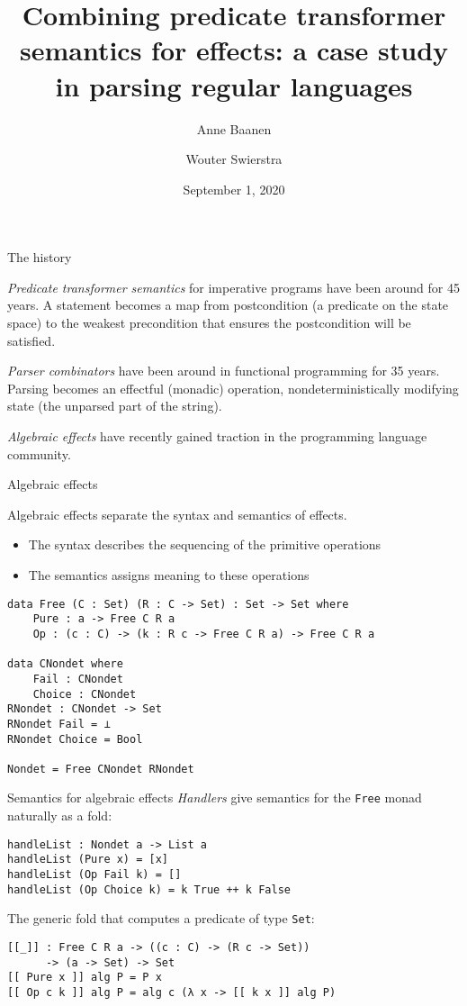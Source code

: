 \documentclass{beamer}
\title[Combining predicate transformer semantics]{Combining predicate transformer semantics for effects: a case study in parsing regular languages}
\author{Anne Baanen \and Wouter Swierstra}
\date{September 1, 2020}
\newcommand{\Agda}[1]{\texttt{\footnotesize #1}\xspace}
\newcommand{\Free}{\Agda{Free}}
\newcommand{\Set}{\Agda{Set}}
\begin{document}
\titlepage

\begin{frame}{The history}

\emph{Predicate transformer semantics} for imperative programs have been around for 45 years.
A statement becomes a map from postcondition (a predicate on the state space) to the weakest precondition that ensures the postcondition will be satisfied.

\pause

\emph{Parser combinators} have been around in functional programming for 35 years.
Parsing becomes an effectful (monadic) operation, nondeterministically modifying state (the unparsed part of the string).

\pause

\emph{Algebraic effects} have recently gained traction in the programming language community.

\end{frame}

\begin{frame}[fragile]{Algebraic effects}

Algebraic effects separate the syntax and semantics of effects.

\begin{itemize}
	\item The syntax describes the sequencing of the primitive operations
	\item The semantics assigns meaning to these operations
\end{itemize}

\begin{verbatim}
data Free (C : Set) (R : C -> Set) : Set -> Set where
	Pure : a -> Free C R a
	Op : (c : C) -> (k : R c -> Free C R a) -> Free C R a

data CNondet where
	Fail : CNondet
	Choice : CNondet
RNondet : CNondet -> Set
RNondet Fail = ⊥
RNondet Choice = Bool

Nondet = Free CNondet RNondet
\end{verbatim}
\end{frame}

\begin{frame}[fragile]{Semantics for algebraic effects}
\emph{Handlers} give semantics for the \Free monad naturally as a fold:

\begin{verbatim}
handleList : Nondet a -> List a
handleList (Pure x) = [x]
handleList (Op Fail k) = []
handleList (Op Choice k) = k True ++ k False
\end{verbatim}

The generic fold that computes a predicate of type \Set:

\begin{verbatim}
[[_]] : Free C R a -> ((c : C) -> (R c -> Set))
      -> (a -> Set) -> Set
[[ Pure x ]] alg P = P x
[[ Op c k ]] alg P = alg c (λ x -> [[ k x ]] alg P)
\end{verbatim}
\end{frame}
\end{document}
